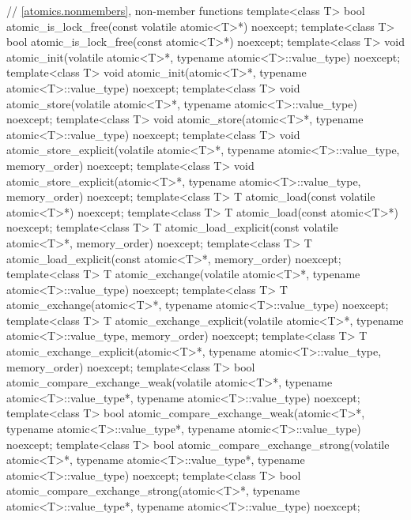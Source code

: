 \begin{codeblock}
{  // \ref{atomics.nonmembers}, non-member functions
  template<class T>
    bool atomic_is_lock_free(const volatile atomic<T>*) noexcept;
  template<class T>
    bool atomic_is_lock_free(const atomic<T>*) noexcept;
  template<class T>
    void atomic_init(volatile atomic<T>*, typename atomic<T>::value_type) noexcept;
  template<class T>
    void atomic_init(atomic<T>*, typename atomic<T>::value_type) noexcept;
  template<class T>
    void atomic_store(volatile atomic<T>*, typename atomic<T>::value_type) noexcept;
  template<class T>
    void atomic_store(atomic<T>*, typename atomic<T>::value_type) noexcept;
  template<class T>
    void atomic_store_explicit(volatile atomic<T>*, typename atomic<T>::value_type,
                               memory_order) noexcept;
  template<class T>
    void atomic_store_explicit(atomic<T>*, typename atomic<T>::value_type,
                               memory_order) noexcept;
  template<class T>
    T atomic_load(const volatile atomic<T>*) noexcept;
  template<class T>
    T atomic_load(const atomic<T>*) noexcept;
  template<class T>
    T atomic_load_explicit(const volatile atomic<T>*, memory_order) noexcept;
  template<class T>
    T atomic_load_explicit(const atomic<T>*, memory_order) noexcept;
  template<class T>
    T atomic_exchange(volatile atomic<T>*, typename atomic<T>::value_type) noexcept;
  template<class T>
    T atomic_exchange(atomic<T>*, typename atomic<T>::value_type) noexcept;
  template<class T>
    T atomic_exchange_explicit(volatile atomic<T>*, typename atomic<T>::value_type,
                               memory_order) noexcept;
  template<class T>
    T atomic_exchange_explicit(atomic<T>*, typename atomic<T>::value_type,
                               memory_order) noexcept;
  template<class T>
    bool atomic_compare_exchange_weak(volatile atomic<T>*,
                                      typename atomic<T>::value_type*,
                                      typename atomic<T>::value_type) noexcept;
  template<class T>
    bool atomic_compare_exchange_weak(atomic<T>*,
                                      typename atomic<T>::value_type*,
                                      typename atomic<T>::value_type) noexcept;
  template<class T>
    bool atomic_compare_exchange_strong(volatile atomic<T>*,
                                        typename atomic<T>::value_type*,
                                        typename atomic<T>::value_type) noexcept;
  template<class T>
    bool atomic_compare_exchange_strong(atomic<T>*,
                                        typename atomic<T>::value_type*,
                                        typename atomic<T>::value_type) noexcept;
}
\end{codeblock}
